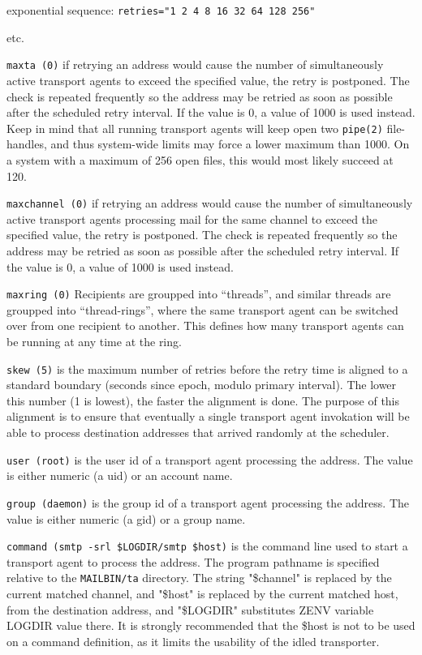 exponential sequence: {\tt  retries="1 2 4 8 16 32 64 128 256" }

etc.

{\tt maxta (0)} 
if retrying an address would cause the number of simultaneously 
active transport agents to exceed the specified  value, the retry is  
postponed. The check is repeated  frequently so  the address may be retried as
soon as possible after the  scheduled  retry interval. If the value is 0, 
a value of 1000 is used instead. Keep in mind that all  running  
transport  agents  will  keep open two {\tt pipe(2)} file-handles, and thus 
system-wide  limits may force a lower maximum than 1000. On a system
with a maximum of 256 open files, this would most likely succeed at 120.

{\tt maxchannel (0)}
if retrying an address would cause the number of 
simultaneously  active  transport agents processing mail for
the same channel to exceed  the  specified  value,  the
retry  is  postponed.  The check is repeated frequently
so the address may be retried as soon as possible after
the  scheduled  retry  interval.   If the value is 0, a
value of 1000 is used instead.

{\tt maxring (0)}
Recipients are groupped into ``threads'',  and  similar
threads  are groupped into ``thread-rings'', where the same
transport agent can be switched over from one recipient
to another.  This defines how many transport agents can
be running at any time at the ring.

{\tt skew (5)}
is the maximum number of retries before the retry  time
is aligned to a standard boundary (seconds since epoch,
modulo primary interval).  The lower this number (1  is
lowest), the faster the alignment is done.  The purpose
of this alignment is to ensure that eventually a single
transport agent invokation will be able to process 
destination addresses that arrived randomly at the  scheduler.

{\tt user (root)}
is  the  user  id  of  a transport agent processing the
address.  The value is either numeric  (a  uid)  or  an
account name.

{\tt group (daemon)}
is  the  group  id  of a transport agent processing the
address.  The value is either  numeric  (a  gid)  or a
group name.

{\tt command (smtp -srl \$LOGDIR/smtp \$host)}
is  the command line used to start a transport agent to
process the address. The program pathname is specified
relative  to the  {\tt MAILBIN/ta}  directory.   The  string
"\$channel" is replaced by the current matched  channel,
and  "\$host" is  replaced by the current matched host,
from the destination address, and "\$LOGDIR" substitutes
ZENV variable LOGDIR value there.  It is strongly 
recommended that the \$host is not to be used on a  command
definition, as it limits the usability of the idled transporter.

